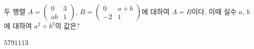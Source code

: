 두 행렬 $A=\begin{pmatrix} 0 & 3 \\ ab & 1 \end{pmatrix}$, $B=\begin{pmatrix} 0 & a+b \\ -2 & 1 \end{pmatrix}$에 대하여 $A=B$이다. 이때 실수 $a$, $b$에 대하여 $a^2+b^2$의 값은?
\begin{choices32}{$5$}{$7$}{$9$}{$11$}{$13$}\end{choices32}
